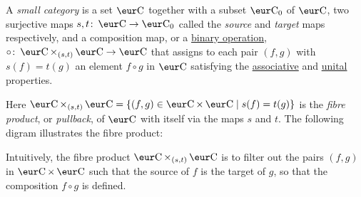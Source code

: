 \begin{definition}\label{def:small_category}
  A \emph{small category} is a set $\Ca$ together with a subset $\Ca_0$ of $\Ca$, two surjective maps $s, t \colon \Ca \to \Ca_0$ called the \emph{source} and \emph{target} maps respectively, and a composition map, or a \hyperref[def:binary_operation]{binary operation}, $\circ \colon \Ca \times_{(s, t)} \Ca \to \Ca$ that assigns to each pair $(f, g)$ with $s(f) = t(g)$ an element $f \circ g$ in $\Ca$ satisfying the \hyperref[def:associative]{associative} and \hyperref[def:unital]{unital} properties.
\end{definition}
Here $\Ca \times_{(s, t)} \Ca = \{ (f, g) \in \Ca \times \Ca \mid s(f) = t(g) \}$ is the \emph{fibre product}, or \emph{pullback}, of $\Ca$ with itself via the maps $s$ and $t$. The following digram illustrates the fibre product:
\begin{center}
\end{center}
Intuitively, the fibre product $\Ca \times_{(s, t)} \Ca$ is to filter out the pairs $(f, g)$ in $\Ca \times \Ca$ such that the source of $f$ is the target of $g$, so that the composition $f \circ g$ is defined.


